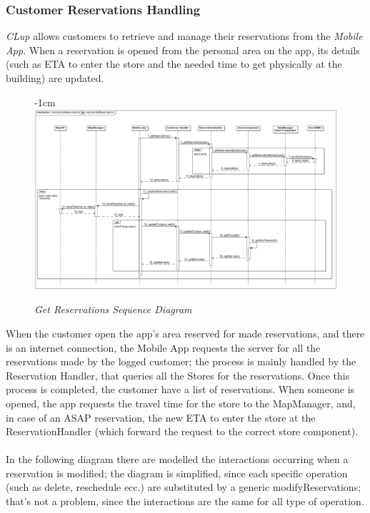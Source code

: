 \documentclass{article}
\begin{document}
	\subsubsection{Customer Reservations Handling}
	\emph{CLup} allows customers to retrieve and manage their reservations from the \emph{Mobile App}. When a reservation is opened from the personal area on the app, its details (such as ETA to enter the store and the needed time to get physically at the building) are updated.
	\begin{figure}[H]
		\begin{adjustwidth} {-1cm}{}
			\centering
			\includegraphics[scale=0.3]{Sequence Diagrams/sd__CustomerGetReservations__CustomerGetReservations.png}
		\end{adjustwidth}
		\caption{\emph{Get Reservations Sequence Diagram}}
	\end{figure}
	When the customer open the app's area reserved for made reservations, and there is an internet connection, the Mobile App requests the server for all the reservations made by the logged customer; the process is mainly handled by the Reservation Handler, that queries all the Stores for the reservations. Once this process is completed, the customer have a list of reservations. When someone is opened, the app requests the travel time for the store to the MapManager, and, in case of an ASAP reservation, the new ETA to enter the store at the ReservationHandler (which forward the request to the correct store component).\\\\
	In the following diagram there are modelled the interactions occurring when a reservation is modified; the diagram is simplified, since each specific operation (such as delete, reschedule ecc.) are substituted by a generic modifyReservations; that's not a problem, since the interactions are the same for all type of operation.
\end{document}
